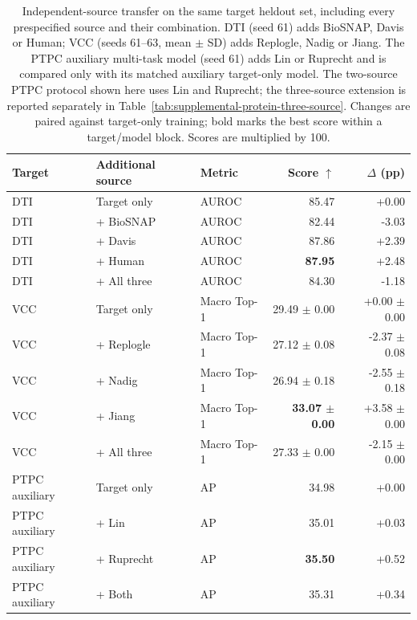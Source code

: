 \begin{table}[htbp]
\caption{Independent-source transfer on the same target heldout set, including every prespecified source and their combination. DTI (seed 61) adds BioSNAP, Davis or Human; VCC (seeds 61--63, mean $\pm$ SD) adds Replogle, Nadig or Jiang. The PTPC auxiliary multi-task model (seed 61) adds Lin or Ruprecht and is compared only with its matched auxiliary target-only model. The two-source PTPC protocol shown here uses Lin and Ruprecht; the three-source extension is reported separately in Table~\ref{tab:supplemental-protein-three-source}. Changes are paired against target-only training; bold marks the best score within a target/model block. Scores are multiplied by 100.}
\label{tab:completed-independent-transfer}
\centering\small
\setlength{\tabcolsep}{4pt}
\begin{tabularx}{\linewidth}{@{}lXlrr@{}}
\toprule
Target & Additional source & Metric & Score $\uparrow$ & $\Delta$ (pp) \\
\midrule
DTI & Target only & AUROC & 85.47 & +0.00 \\
DTI & + BioSNAP & AUROC & 82.44 & -3.03 \\
DTI & + Davis & AUROC & 87.86 & +2.39 \\
DTI & + Human & AUROC & \textbf{87.95} & +2.48 \\
DTI & + All three & AUROC & 84.30 & -1.18 \\
\midrule
VCC & Target only & Macro Top-1 & 29.49 $\pm$ 0.00 & +0.00 $\pm$ 0.00 \\
VCC & + Replogle & Macro Top-1 & 27.12 $\pm$ 0.08 & -2.37 $\pm$ 0.08 \\
VCC & + Nadig & Macro Top-1 & 26.94 $\pm$ 0.18 & -2.55 $\pm$ 0.18 \\
VCC & + Jiang & Macro Top-1 & \textbf{33.07 $\pm$ 0.00} & +3.58 $\pm$ 0.00 \\
VCC & + All three & Macro Top-1 & 27.33 $\pm$ 0.00 & -2.15 $\pm$ 0.00 \\
\midrule
PTPC auxiliary & Target only & AP & 34.98 & +0.00 \\
PTPC auxiliary & + Lin & AP & 35.01 & +0.03 \\
PTPC auxiliary & + Ruprecht & AP & \textbf{35.50} & +0.52 \\
PTPC auxiliary & + Both & AP & 35.31 & +0.34 \\
\bottomrule
\end{tabularx}
\end{table}
